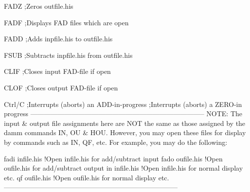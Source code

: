    FADZ                ;Zeros outfile.his
 
   FADF                ;Displays FAD files which are open
 
   FADD                ;Adds      inpfile.his to   outfile.his
 
   FSUB                ;Subtracts inpfile.his from outfile.his
 
   CLIF                ;Closes input  FAD-file if open
 
   CLOF                ;Closes output FAD-file if open
 
   Ctrl/C              ;Interrupts (aborts) an ADD-in-progress
                       ;Interrupts (aborts) a ZERO-in progress
   -----------------------------------------------------------------------------
   NOTE: The input & output file assignments here are NOT the same as those
         assigned by the damm commands IN, OU & HOU. However, you may open these
         files for display by commands such as IN, QF, etc.
         For example, you may do the following:
 
   fadi infile.his  !Open infile.his for add/subtract input
   fado oufile.his  !Open oufile.his for add/subtract output
   in   infile.his  !Open infile.his for normal display etc.
   qf   oufile.his  !Open oufile.his for normal display etc.
   -----------------------------------------------------------------------------

